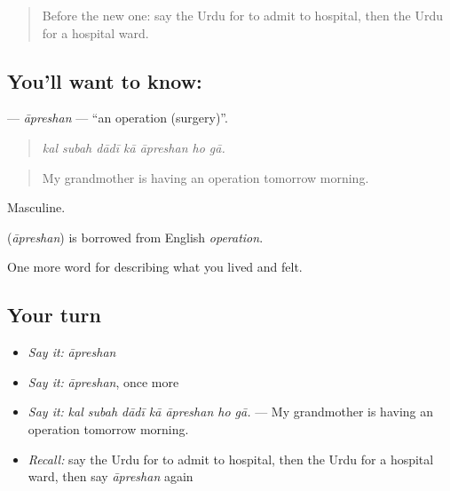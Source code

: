 \label{lesson:UR-C479-apreshan}



\begin{quote}
Before the new one: say the Urdu for to admit to hospital, then the Urdu for a hospital ward.
\end{quote}

\subsection*{You'll want to know: }
\textbf{} — \emph{āpreshan} — \textquotedblleft{}an operation (surgery)\textquotedblright{}.

\begin{quote}
      
\end{quote}

\begin{quote}
\emph{kal subah dādī kā āpreshan ho gā.}
\end{quote}

\begin{quote}
My grandmother is having an operation tomorrow morning.
\end{quote}

Masculine.

\begin{cousinweb}
\textbf{} (\emph{āpreshan}) is borrowed from English \emph{operation}.
\end{cousinweb}

\begin{grammarlens}[title={What you've built}]
One more word for describing what you lived and felt.
\end{grammarlens}

\subsection*{Your turn}
\begin{itemize}
\raggedright
  \item \emph{Say it:} \emph{āpreshan}
  \item \emph{Say it:} \emph{āpreshan}, once more
  \item \emph{Say it:} \emph{kal subah dādī kā āpreshan ho gā.} — My grandmother is having an operation tomorrow morning.
  \item \emph{Recall:} say the Urdu for to admit to hospital, then the Urdu for a hospital ward, then say \emph{āpreshan} again
\end{itemize}

